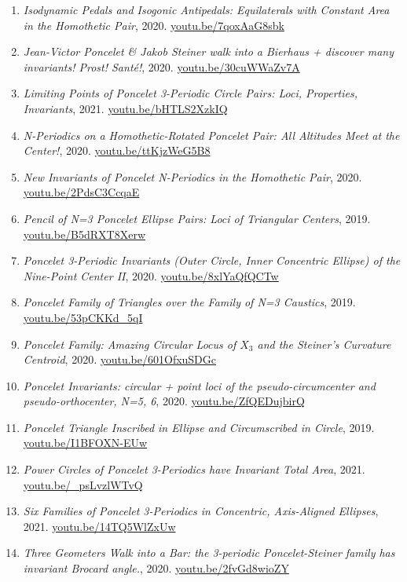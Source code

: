 \documentclass[12pt]{article}
\begin{document}
\begin{enumerate}[resume]
\item \textit{Isodynamic Pedals and Isogonic Antipedals: Equilaterals with Constant Area in the Homothetic Pair}, 2020. \href{https://youtu.be/7qoxAaG8sbk}{\url{youtu.be/7qoxAaG8sbk}}
\item \textit{Jean-Victor Poncelet \& Jakob Steiner walk into a Bierhaus + discover many invariants! Prost! Santé!}, 2020. \href{https://youtu.be/30cuWWaZv7A}{\url{youtu.be/30cuWWaZv7A}}
\item \textit{Limiting Points of Poncelet 3-Periodic Circle Pairs: Loci, Properties, Invariants}, 2021. \href{https://youtu.be/bHTLS2XzkIQ}{\url{youtu.be/bHTLS2XzkIQ}}
\item \textit{N-Periodics on a Homothetic-Rotated Poncelet Pair: All Altitudes Meet at the Center!}, 2020. \href{https://youtu.be/ttKjzWeG5B8}{\url{youtu.be/ttKjzWeG5B8}}
\item \textit{New Invariants of Poncelet N-Periodics in the Homothetic Pair}, 2020. \href{https://youtu.be/2PdsC3CcqaE}{\url{youtu.be/2PdsC3CcqaE}}
\item \textit{Pencil of N=3 Poncelet Ellipse Pairs: Loci of Triangular Centers}, 2019. \href{https://youtu.be/B5dRXT8Xerw}{\url{youtu.be/B5dRXT8Xerw}}
\item \textit{Poncelet 3-Periodic Invariants (Outer Circle, Inner Concentric Ellipse) of the Nine-Point Center II}, 2020. \href{https://youtu.be/8xlYaQfQCTw}{\url{youtu.be/8xlYaQfQCTw}}
\item \textit{Poncelet Family of Triangles over the Family of N=3 Caustics}, 2019. \href{https://youtu.be/53pCKKd_5qI}{\url{youtu.be/53pCKKd\_5qI}}
\item \textit{Poncelet Family: Amazing Circular Locus of $X_{3}$ and the Steiner's Curvature Centroid}, 2020. \href{https://youtu.be/601OfxuSDGc}{\url{youtu.be/601OfxuSDGc}}
\item \textit{Poncelet Invariants:
circular + point loci of the pseudo-circumcenter and pseudo-orthocenter, N=5, 6}, 2020. \href{https://youtu.be/ZfQEDujbirQ}{\url{youtu.be/ZfQEDujbirQ}}
\item \textit{Poncelet Triangle Inscribed in Ellipse and Circumscribed in Circle}, 2019. \href{https://youtu.be/I1BFOXN-EUw}{\url{youtu.be/I1BFOXN-EUw}}
\item \textit{Power Circles of Poncelet 3-Periodics have Invariant Total Area}, 2021. \href{https://youtu.be/_psLvzlWTvQ}{\url{youtu.be/\_psLvzlWTvQ}}
\item \textit{Six Families of Poncelet 3-Periodics in Concentric, Axis-Aligned Ellipses}, 2021. \href{https://youtu.be/14TQ5WlZxUw}{\url{youtu.be/14TQ5WlZxUw}}
\item \textit{Three Geometers Walk into a Bar: the 3-periodic Poncelet-Steiner family has invariant Brocard angle.}, 2020. \href{https://youtu.be/2fvGd8wioZY}{\url{youtu.be/2fvGd8wioZY}}
\end{enumerate}
\end{document}

